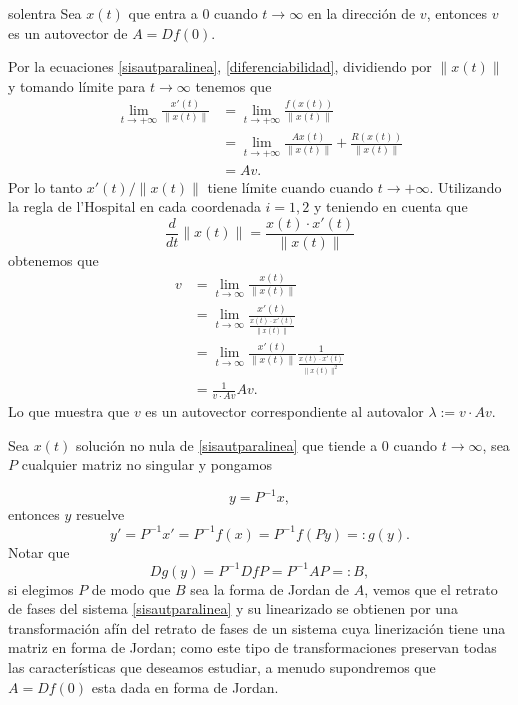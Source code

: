 \begin{teorema}{solentra} Sea $x(t)$ que entra a $0$ cuando $t\to\infty$ en
la dirección de $v$, entonces $v$ es un autovector de $A=Df(0)$.
\end{teorema}

\begin{demo} Por la ecuaciones \eqref{sisautparalinea},
\eqref{diferenciabilidad}, dividiendo por $\|x(t)\|$ y tomando
límite para $t\to\infty$ tenemos que
\[
    \begin{split}
    \lim\limits_{t\to+\infty}\frac{x'(t)}{\|x(t)\|} &=
    \lim\limits_{t\to+\infty}\frac{f(x(t))}{\|x(t)\|}\\
     &=\lim\limits_{t\to+\infty}\frac{Ax(t)}{\|x(t)\|}+\frac{R(x(t))}{\|x(t)\|}\\
     &= Av.
    \end{split}
\]
Por lo tanto $x'(t)/\|x(t)\|$ tiene límite cuando  cuando
$t\to+\infty$. Utilizando la regla de l'Hospital en cada
coordenada $i=1,2$ y teniendo en cuenta que
\[
    \frac{d}{dt}\|x(t)\|=\frac{x(t)\cdot x'(t)}{\|x(t)\|}
\]
obtenemos que
\[
    \begin{split}
     v&=\lim\limits_{t\to\infty}\frac{x(t)}{\|x(t)\|}\\
     &= \lim\limits_{t\to\infty}\frac{x'(t)}{\frac{x(t)\cdot
     x'(t)}{\|x(t)\|}}\\
     &=\lim\limits_{t\to\infty}\frac{x'(t)}{\|x(t)\|}\frac{1}{\frac{x(t)\cdot
     x'(t)}{\|x(t)\|^2}}\\
     &=\frac{1}{v\cdot Av}Av.
    \end{split}
\]
Lo que muestra que $v$ es un autovector correspondiente al
autovalor $\lambda:=v\cdot Av$.\end{demo}




Sea $x(t)$ solución no nula de \eqref{sisautparalinea} que tiende
a $0$ cuando $t\to\infty$, sea $P$ cualquier matriz no singular y
pongamos

\begin{equation}\label{cambioafin}
    y=P^{-1}x,
\end{equation}
 entonces $y$ resuelve
\[
    y'=P^{-1}x'=P^{-1}f(x)=P^{-1}f(Py)=:g(y).
\]
Notar que
\[
    Dg(y)=P^{-1}DfP=P^{-1}AP=:B,
\]
si elegimos $P$ de modo que $B$ sea la forma de Jordan de $A$,
vemos que el retrato de fases del sistema \eqref{sisautparalinea}
y su  linearizado se obtienen por una transformación afín del
retrato de fases de un sistema cuya linerización tiene una matriz
en forma de Jordan; como este tipo de transformaciones preservan
todas las características que deseamos estudiar,  a menudo
supondremos que $A=Df(0)$ esta dada en forma de Jordan.





